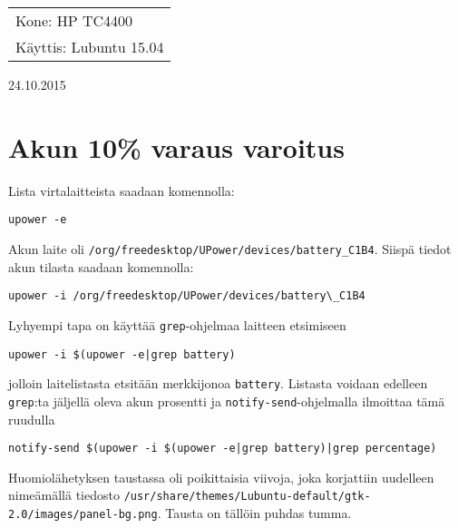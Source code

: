 \documentclass[main.tex]{subfiles}
\begin{document}
\thispagestyle{empty}
\begin{tabular}[t]{l}
Kone: HP TC4400\\
Käyttis: Lubuntu 15.04
\end{tabular}
\hfill 24.10.2015

{\section{Akun 10\% varaus varoitus}}

Lista virtalaitteista saadaan komennolla: 

\begin{lstlisting}
upower -e
\end{lstlisting}

Akun laite oli \texttt{/org/freedesktop/UPower/devices/battery\_C1B4}. Siispä tiedot akun tilasta saadaan komennolla:

\begin{lstlisting}
upower -i /org/freedesktop/UPower/devices/battery\_C1B4
\end{lstlisting}

Lyhyempi tapa on käyttää \texttt{grep}-ohjelmaa laitteen etsimiseen

\begin{lstlisting}
upower -i $(upower -e|grep battery)
\end{lstlisting}

jolloin laitelistasta etsitään merkkijonoa \texttt{battery}. Listasta voidaan edelleen \texttt{grep}:ta jäljellä oleva akun prosentti ja \texttt{notify-send}-ohjelmalla ilmoittaa tämä ruudulla

\begin{lstlisting}
notify-send $(upower -i $(upower -e|grep battery)|grep percentage)
\end{lstlisting}

Huomiolähetyksen taustassa oli poikittaisia viivoja, joka korjattiin uudelleen nimeämällä tiedosto \texttt{/usr/share/themes/Lubuntu-default/gtk-2.0/images/panel-bg.png}. Tausta on tällöin puhdas tumma.
\end{document}
